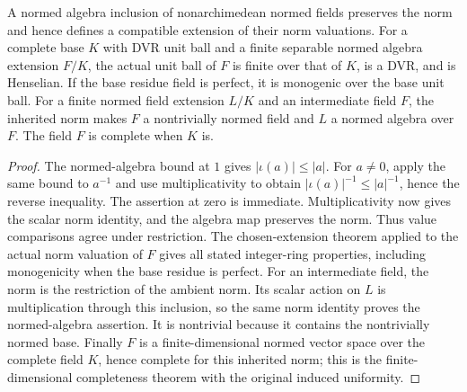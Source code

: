 \begin{lemma}
\label{fw:normed-intermediate-tower}
\leanok
A normed algebra inclusion of nonarchimedean normed fields preserves
the norm and hence defines a compatible extension of their norm
valuations. For a complete base $K$ with DVR unit ball and a finite
separable normed algebra extension $F/K$, the actual unit ball of $F$
is finite over that of $K$, is a DVR, and is Henselian. If the base
residue field is perfect, it is monogenic over the base unit ball.
For a finite normed field extension $L/K$ and an intermediate field
$F$, the inherited norm makes $F$ a nontrivially normed field and
$L$ a normed algebra over $F$. The field $F$ is complete when $K$ is.
\end{lemma}
\begin{proof}
The normed-algebra bound at $1$ gives $|\iota(a)|\leq |a|$.
For $a\ne0$, apply the same bound to $a^{-1}$ and use multiplicativity
to obtain $|\iota(a)|^{-1}\leq |a|^{-1}$, hence the reverse inequality.
The assertion at zero is immediate. Multiplicativity now gives the
scalar norm identity, and the algebra map preserves the norm. Thus value comparisons agree under
restriction. The chosen-extension theorem applied to the actual norm
valuation of $F$ gives all stated integer-ring properties, including
monogenicity when the base residue is perfect.
For an intermediate field, the norm is the restriction of the ambient
norm. Its scalar action on $L$ is multiplication through this inclusion,
so the same norm identity proves the normed-algebra assertion. It is
nontrivial because it contains the nontrivially normed base. Finally
$F$ is a finite-dimensional normed vector space over the complete field
$K$, hence complete for this inherited norm; this is the finite-dimensional
completeness theorem with the original induced uniformity.
\end{proof}

